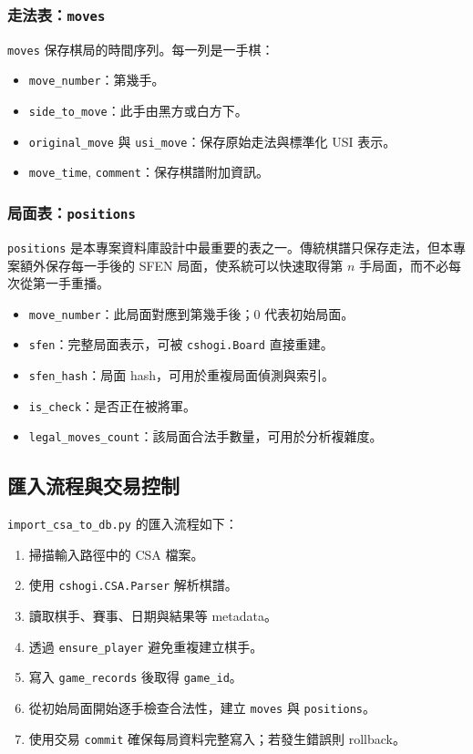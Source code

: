 \documentclass[12pt,a4paper,fontset=none]{ctexart}
\begin{document}
\subsubsection{走法表：\texttt{moves}}
\texttt{moves} 保存棋局的時間序列。每一列是一手棋：

\begin{itemize}
  \item \texttt{move\_number}：第幾手。
  \item \texttt{side\_to\_move}：此手由黑方或白方下。
  \item \texttt{original\_move} 與 \texttt{usi\_move}：保存原始走法與標準化 USI 表示。
  \item \texttt{move\_time}, \texttt{comment}：保存棋譜附加資訊。
\end{itemize}

\subsubsection{局面表：\texttt{positions}}
\texttt{positions} 是本專案資料庫設計中最重要的表之一。傳統棋譜只保存走法，但本專案額外保存每一手後的 SFEN 局面，使系統可以快速取得第 $n$ 手局面，而不必每次從第一手重播。

\begin{itemize}
  \item \texttt{move\_number}：此局面對應到第幾手後；0 代表初始局面。
  \item \texttt{sfen}：完整局面表示，可被 \texttt{cshogi.Board} 直接重建。
  \item \texttt{sfen\_hash}：局面 hash，可用於重複局面偵測與索引。
  \item \texttt{is\_check}：是否正在被將軍。
  \item \texttt{legal\_moves\_count}：該局面合法手數量，可用於分析複雜度。
\end{itemize}

\subsection{匯入流程與交易控制}
\texttt{import\_csa\_to\_db.py} 的匯入流程如下：

\begin{enumerate}
  \item 掃描輸入路徑中的 CSA 檔案。
  \item 使用 \texttt{cshogi.CSA.Parser} 解析棋譜。
  \item 讀取棋手、賽事、日期與結果等 metadata。
  \item 透過 \texttt{ensure\_player} 避免重複建立棋手。
  \item 寫入 \texttt{game\_records} 後取得 \texttt{game\_id}。
  \item 從初始局面開始逐手檢查合法性，建立 \texttt{moves} 與 \texttt{positions}。
  \item 使用交易 \texttt{commit} 確保每局資料完整寫入；若發生錯誤則 rollback。
\end{enumerate}
\end{document}
